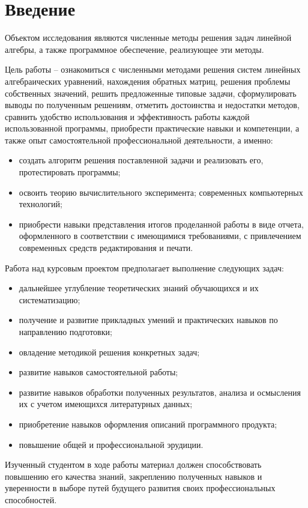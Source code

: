 \section{Введение}
    Объектом исследования являются численные методы решения задач линейной алгебры, а также программное обеспечение, реализующее эти методы.
    
    Цель работы – ознакомиться с численными методами решения систем линейных алгебраических уравнений, нахождения обратных матриц, решения проблемы собственных значений, решить предложенные типовые задачи, сформулировать выводы по полученным решениям, отметить достоинства и недостатки методов, сравнить удобство использования и эффективность работы каждой использованной программы, приобрести практические навыки и компетенции, а также опыт самостоятельной профессиональной деятельности, а именно:
    \begin{itemize}
        \setlength{\itemsep}{0em}
        \item создать алгоритм решения поставленной задачи и реализовать его, протестировать программы;
        \item освоить теорию вычислительного эксперимента; современных компьютерных технологий;
        \item приобрести навыки представления итогов проделанной работы в виде отчета, оформленного в соответствии с имеющимися требованиями, с привлечением современных средств редактирования и печати.
    \end{itemize}

    Работа над курсовым проектом предполагает выполнение следующих задач:
    \begin{itemize}
        \setlength{\itemsep}{0em}
        \item дальнейшее углубление теоретических знаний обучающихся и их систематизацию;
        \item получение и развитие прикладных умений и практических навыков по направлению подготовки;
        \item овладение методикой решения конкретных задач;
        \item развитие навыков самостоятельной работы;
        \item развитие навыков обработки полученных результатов, анализа и осмысления их с учетом имеющихся литературных данных;
        \item приобретение навыков оформления описаний программного продукта;
        \item повышение общей и профессиональной эрудиции.
    \end{itemize}
    
    Изученный студентом в ходе работы материал должен способствовать повышению его качества знаний, закреплению полученных навыков и уверенности в выборе путей будущего развития своих профессиональных способностей.
